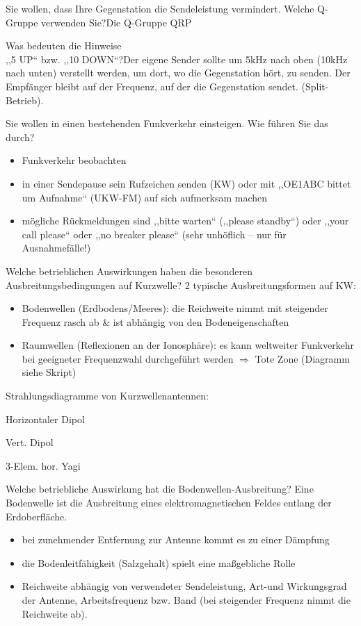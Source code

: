 \documentclass[avery5371,grid,frame,a4paper]{flashcards}
\newcommand{\card}[3]{
  \begin{flashcard}[{\chap} -- #1]{#2}#3\end{flashcard}
}
\begin{document}
\card{04}{Sie wollen, dass Ihre Gegenstation die Sendeleistung vermindert. Welche Q-Gruppe verwenden Sie?}{Die Q-Gruppe QRP}
\card{05}{Was bedeuten die Hinweise \\ ,,5 UP`` bzw. ,,10 DOWN``?}{Der eigene Sender sollte um 5kHz nach oben (10kHz nach unten) verstellt werden, um dort, wo die Gegenstation hört, zu senden. Der Empfänger bleibt auf der Frequenz, auf der die Gegenstation sendet. (Split-Betrieb).}
\card{06}{Sie wollen in einen bestehenden Funkverkehr einsteigen. Wie führen Sie das durch?}{
  \begin{itemize}
    \item Funkverkehr beobachten
    \item in einer Sendepause sein Rufzeichen senden (KW) oder mit ,,OE1ABC bittet um Aufnahme`` (UKW-FM) auf sich aufmerksam machen
    \item mögliche Rückmeldungen sind ,,bitte warten`` (,,please standby``) oder ,,your call please`` oder ,,no breaker please`` (sehr unhöflich – nur für Ausnahmefälle!)
  \end{itemize}
}
\card{07}{Welche betrieblichen Auswirkungen haben die besonderen Ausbreitungsbedingungen auf Kurzwelle?}{
  \small
  2 typische Ausbreitungsformen auf KW:
  \begin{itemize}
    \item Bodenwellen (Erdbodens/Meeres): die Reichweite nimmt mit steigender Frequenz rasch ab \& ist abhängig von den Bodeneigenschaften
    \item Raumwellen (Reflexionen an der Ionosphäre): es kann weltweiter Funkverkehr bei geeigneter Frequenzwahl durchgeführt werden $\Rightarrow$ Tote Zone (Diagramm siehe Skript)
  \end{itemize}

  Strahlungsdiagramme von Kurzwellenantennen: \\
  \begin{itemize*}
    \item Horizontaler Dipol
    \item Vert. Dipol
    \item 3-Elem. hor. Yagi
  \end{itemize*}
}
\card{08}{Welche betriebliche Auswirkung hat die Bodenwellen-Ausbreitung?}{
  \small
  Eine Bodenwelle ist die Ausbreitung eines elektromagnetischen Feldes entlang der Erdoberfläche.
  \begin{itemize}
    \item bei zunehmender Entfernung zur Antenne kommt es zu einer Dämpfung
    \item die Bodenleitfähigkeit (Salzgehalt) spielt eine maßgebliche Rolle
    \item Reichweite abhängig von verwendeter Sendeleistung, Art-und Wirkungsgrad der Antenne, Arbeitsfrequenz bzw. Band (bei steigender Frequenz nimmt die Reichweite ab).
  \end{itemize}
}
\end{document}
